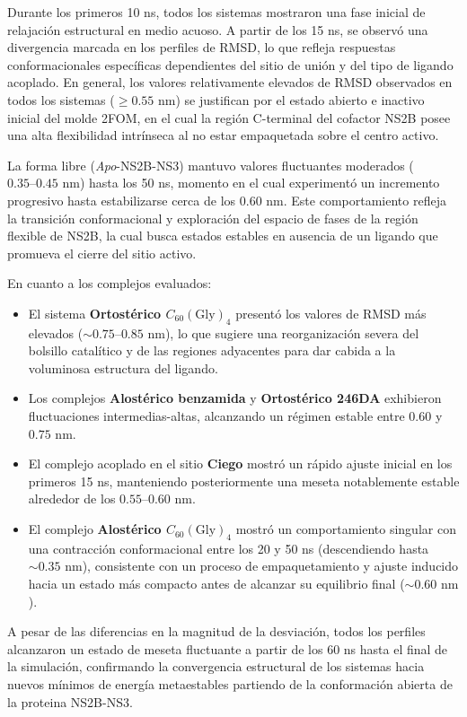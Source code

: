 Durante los primeros 10 ns, todos los sistemas mostraron una fase inicial de relajación estructural en medio acuoso. A partir de los 15 ns, se observó una divergencia marcada en los perfiles de RMSD, lo que refleja respuestas conformacionales específicas dependientes del sitio de unión y del tipo de ligando acoplado. En general, los valores relativamente elevados de RMSD observados en todos los sistemas ($\ge 0.55\text{ nm}$) se justifican por el estado abierto e inactivo inicial del molde 2FOM, en el cual la región C-terminal del cofactor NS2B posee una alta flexibilidad intrínseca al no estar empaquetada sobre el centro activo.

La forma libre (\textit{Apo}-NS2B-NS3) mantuvo valores fluctuantes moderados ($0.35\text{--}0.45\text{ nm}$) hasta los 50 ns, momento en el cual experimentó un incremento progresivo hasta estabilizarse cerca de los $0.60\text{ nm}$. Este comportamiento refleja la transición conformacional y exploración del espacio de fases de la región flexible de NS2B, la cual busca estados estables en ausencia de un ligando que promueva el cierre del sitio activo.

En cuanto a los complejos evaluados:
\begin{itemize}
    \item El sistema \textbf{Ortostérico $C_{60}(\text{Gly})_4$} presentó los valores de RMSD más elevados ($\sim 0.75\text{--}0.85\text{ nm}$), lo que sugiere una reorganización severa del bolsillo catalítico y de las regiones adyacentes para dar cabida a la voluminosa estructura del ligando.
    \item Los complejos \textbf{Alostérico benzamida} y \textbf{Ortostérico 246DA} exhibieron fluctuaciones intermedias-altas, alcanzando un régimen estable entre $0.60$ y $0.75\text{ nm}$.
    \item El complejo acoplado en el sitio \textbf{Ciego} mostró un rápido ajuste inicial en los primeros 15 ns, manteniendo posteriormente una meseta notablemente estable alrededor de los $0.55\text{--}0.60\text{ nm}$.
    \item El complejo \textbf{Alostérico $C_{60}(\text{Gly})_4$} mostró un comportamiento singular con una contracción conformacional entre los 20 y 50 ns (descendiendo hasta $\sim 0.35\text{ nm}$), consistente con un proceso de empaquetamiento y ajuste inducido hacia un estado más compacto antes de alcanzar su equilibrio final ($\sim 0.60\text{ nm}$).
\end{itemize}

A pesar de las diferencias en la magnitud de la desviación, todos los perfiles alcanzaron un estado de meseta fluctuante a partir de los 60 ns hasta el final de la simulación, confirmando la convergencia estructural de los sistemas hacia nuevos mínimos de energía metaestables partiendo de la conformación abierta de la proteina NS2B-NS3.

